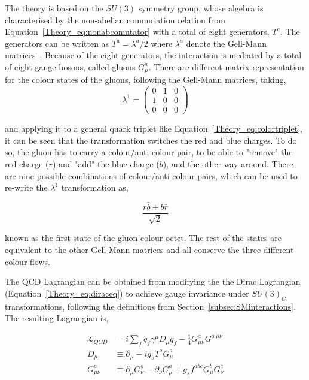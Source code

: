 The theory is based on the $SU(3)$ symmetry group, whose algebra is characterised by the non-abelian commutation relation from Equation~\ref{Theory_eq:nonabcomutator}
with a total of eight generators, $T^a$. The generators can be written as $T^a=\lambda^a/2$ where $\lambda^a$
denote the Gell-Mann matrices~\cite{GellMann}.
Because of the eight generators, the interaction is mediated by a total of eight gauge bosons, called gluons $G_\mu^a$.
There are different matrix representation for the colour states of the gluons, following the Gell-Mann matrices, taking,
\begin{equation}
\lambda^1 = \begin{pmatrix} 0 & 1 & 0 \\
1 & 0 & 0 \\
0 & 0 & 0 \end{pmatrix}
\end{equation}

and applying it to a general quark triplet like Equation~\ref{Theory_eq:colortriplet},
it can be seen that the transformation switches the red and blue charges.
To do so, the gluon has to carry a colour/anti-colour pair, to be able to "remove" the red charge ($r$) and "add" the blue charge ($b$),
and the other way around. There are nine possible combinations of colour/anti-colour pairs, which can be used to re-write the $\lambda^1$
transformation as,

\begin{equation}
\frac{r\bar{b}+b\bar{r}}{\sqrt{2}}
\end{equation}

known as the first state of the gluon colour octet. The rest of the states are equivalent to the other Gell-Mann matrices and all conserve
the three different colour flows.

The QCD Lagrangian can be obtained from modifying the the Dirac Lagrangian (Equation~\ref{Theory_eq:diraceq})
to achieve gauge invariance under $SU(3)_C$ transformations, following the definitions from Section~\ref{subsec:SMinteractions}.
The resulting Lagrangian is,

\begin{equation}
\label{Theory_eq:diraceq30}
\begin{split}
    \mathcal{L}_{QCD} &= i\sum_f \bar{q}_f\gamma^\mu D_\mu q_f - \frac{1}{4}G_{\mu\nu}^aG^{a\ \mu\nu} \\
    D_{\mu \ } &\equiv \partial_\mu -ig_sT^aG^a_\mu \\
    G_{\mu\nu}^a &\equiv \partial_\mu G_\nu^a - \partial_\nu G_\mu^a + g_s f^{abc}G_\mu^b G_\nu^c
\end{split}
\end{equation}

